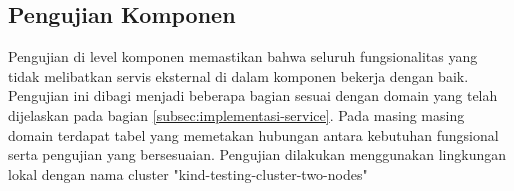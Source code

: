 \subsection{Pengujian Komponen}
Pengujian di level komponen memastikan bahwa seluruh fungsionalitas yang tidak melibatkan servis eksternal di dalam komponen bekerja dengan baik. Pengujian ini dibagi menjadi beberapa bagian sesuai dengan domain yang telah dijelaskan pada bagian \ref{subsec:implementasi-service}. Pada masing masing domain terdapat tabel yang memetakan hubungan antara kebutuhan fungsional serta pengujian yang bersesuaian. Pengujian dilakukan menggunakan lingkungan lokal dengan nama cluster "kind-testing-cluster-two-nodes"




